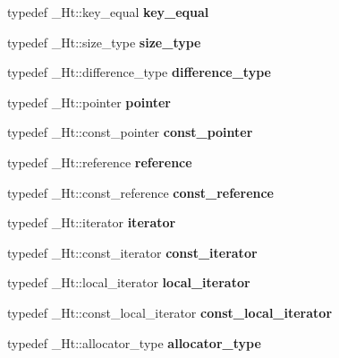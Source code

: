 \begin{DoxyCompactItemize}
typedef \+\_\+\+Ht\+::key\+\_\+equal {\bfseries key\+\_\+equal}
\item 
\mbox{\label{classunordered__multimap_a16886a47a04a391e5aa49258f5a7f59a}} 
typedef \+\_\+\+Ht\+::size\+\_\+type {\bfseries size\+\_\+type}
\item 
\mbox{\label{classunordered__multimap_a1e189773e416f659a90a1aee01994394}} 
typedef \+\_\+\+Ht\+::difference\+\_\+type {\bfseries difference\+\_\+type}
\item 
\mbox{\label{classunordered__multimap_aebd6550d1eaa0a1992faed53656d5c51}} 
typedef \+\_\+\+Ht\+::pointer {\bfseries pointer}
\item 
\mbox{\label{classunordered__multimap_a834869f5d144c2fb8d00a6d0f2477d13}} 
typedef \+\_\+\+Ht\+::const\+\_\+pointer {\bfseries const\+\_\+pointer}
\item 
\mbox{\label{classunordered__multimap_a21279ebe73b731dd55899ab8f3fb1248}} 
typedef \+\_\+\+Ht\+::reference {\bfseries reference}
\item 
\mbox{\label{classunordered__multimap_a644b922a4d98001191f0a4a8e7755883}} 
typedef \+\_\+\+Ht\+::const\+\_\+reference {\bfseries const\+\_\+reference}
\item 
\mbox{\label{classunordered__multimap_a1489a1704510dbb76a9d863e96a6b938}} 
typedef \+\_\+\+Ht\+::iterator {\bfseries iterator}
\item 
\mbox{\label{classunordered__multimap_a4b5a0aecc0a1806f9941ddd27645cedd}} 
typedef \+\_\+\+Ht\+::const\+\_\+iterator {\bfseries const\+\_\+iterator}
\item 
\mbox{\label{classunordered__multimap_aac87c39e87653ab9d8856e33552f5259}} 
typedef \+\_\+\+Ht\+::local\+\_\+iterator {\bfseries local\+\_\+iterator}
\item 
\mbox{\label{classunordered__multimap_ab7bb4f5cfdda2295478dc33e3a333d13}} 
typedef \+\_\+\+Ht\+::const\+\_\+local\+\_\+iterator {\bfseries const\+\_\+local\+\_\+iterator}
\item 
\mbox{\label{classunordered__multimap_a0b9d43d97d37f5382fd069dad0851e58}} 
typedef \+\_\+\+Ht\+::allocator\+\_\+type {\bfseries allocator\+\_\+type}
\end{DoxyCompactItemize}

